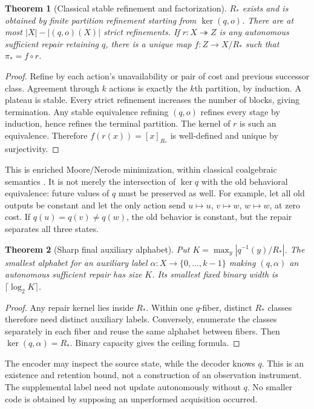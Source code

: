 \documentclass[11pt]{article}
\newtheorem{theorem}{Theorem}[section]
\theoremstyle{definition}
\begin{document}
\begin{theorem}[Classical stable refinement and factorization]
$R_*$ exists and is obtained by finite partition refinement starting from
$\ker(q,o)$. There are at most $|X|-|(q,o)(X)|$ strict refinements. If
$r:X\twoheadrightarrow Z$ is any autonomous sufficient repair retaining $q$,
there is a unique map $f:Z\to X/R_*$ such that $\pi_*=f\circ r$.
\end{theorem}
\begin{proof}
Refine by each action's unavailability or pair of cost and previous successor
class. Agreement through $k$ actions is exactly the $k$th partition, by
induction. A plateau is stable. Every strict refinement increases the number
of blocks, giving termination. Any stable equivalence refining $(q,o)$
refines every stage by induction, hence refines the terminal partition.
The kernel of $r$ is such an equivalence. Therefore $f(r(x))=[x]_{R_*}$ is
well-defined and unique by surjectivity.
\end{proof}

This is enriched Moore/Nerode minimization, within classical coalgebraic
semantics \cite{Moore,Rutten}. It is not merely the intersection of $\ker q$
with the old behavioral equivalence: future values of $q$ must be preserved
as well. For example, let all old outputs be constant and let the only action
send $u\mapsto u$, $v\mapsto w$, $w\mapsto w$, at zero cost. If
$q(u)=q(v)\ne q(w)$, the old behavior is constant, but the repair separates
all three states.

\begin{theorem}[Sharp final auxiliary alphabet]
Put $K=\max_y|q^{-1}(y)/R_*|$. The smallest alphabet for an auxiliary label
$\alpha:X\to\{0,\ldots,k-1\}$ making $(q,\alpha)$ an autonomous sufficient
repair has size $K$. Its smallest fixed binary width is $\lceil\log_2K\rceil$.
\end{theorem}
\begin{proof}
Any repair kernel lies inside $R_*$. Within one $q$-fiber, distinct $R_*$
classes therefore need distinct auxiliary labels. Conversely, enumerate the
classes separately in each fiber and reuse the same alphabet between fibers.
Then $\ker(q,\alpha)=R_*$. Binary capacity gives the ceiling formula.
\end{proof}

The encoder may inspect the source state, while the decoder knows $q$.
This is an existence and retention bound, not a construction of an observation
instrument. The supplemental label need not update autonomously without $q$.
No smaller code is obtained by supposing an unperformed acquisition occurred.
\end{document}
